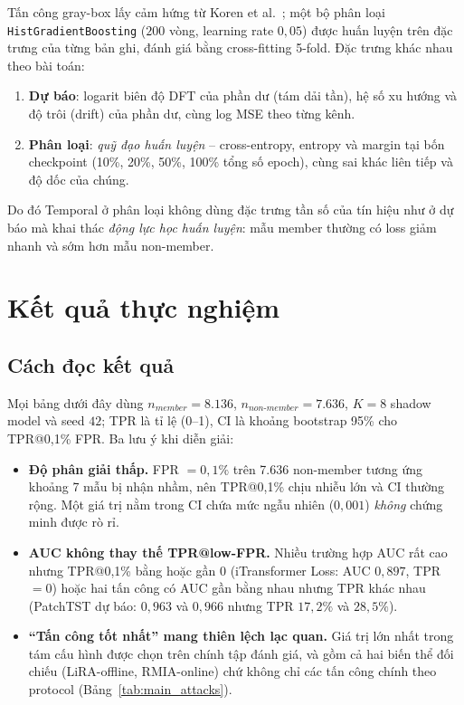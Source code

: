 \documentclass[12pt,a4paper]{report}
\begin{document}
Tấn công gray-box lấy cảm hứng từ Koren et al.\ \cite{koren2025}; một bộ phân loại \texttt{HistGradientBoosting} ($200$ vòng, learning rate $0{,}05$) được huấn luyện trên đặc trưng của từng bản ghi, đánh giá bằng cross-fitting 5-fold. Đặc trưng khác nhau theo bài toán:
\begin{enumerate}
  \item \textbf{Dự báo}: logarit biên độ DFT của phần dư (tám dải tần), hệ số xu hướng và độ trôi (drift) của phần dư, cùng log MSE theo từng kênh.
  \item \textbf{Phân loại}: \textit{quỹ đạo huấn luyện} -- cross-entropy, entropy và margin tại bốn checkpoint (10\%, 20\%, 50\%, 100\% tổng số epoch), cùng sai khác liên tiếp và độ dốc của chúng.
\end{enumerate}
Do đó Temporal ở phân loại không dùng đặc trưng tần số của tín hiệu như ở dự báo mà khai thác \textit{động lực học huấn luyện}: mẫu member thường có loss giảm nhanh và sớm hơn mẫu non-member.

\chapter{Kết quả thực nghiệm}
\label{chap:results}

\section{Cách đọc kết quả}

Mọi bảng dưới đây dùng $n_{member} = 8.136$, $n_{non\text{-}member} = 7.636$, $K = 8$ shadow model và seed $42$; TPR là tỉ lệ (0--1), CI là khoảng bootstrap 95\% cho TPR@0,1\% FPR. Ba lưu ý khi diễn giải:
\begin{itemize}
  \item \textbf{Độ phân giải thấp.} FPR $= 0{,}1\%$ trên 7.636 non-member tương ứng khoảng 7 mẫu bị nhận nhầm, nên TPR@0,1\% chịu nhiễu lớn và CI thường rộng. Một giá trị nằm trong CI chứa mức ngẫu nhiên ($0{,}001$) \textit{không} chứng minh được rò rỉ.
  \item \textbf{AUC không thay thế TPR@low-FPR.} Nhiều trường hợp AUC rất cao nhưng TPR@0,1\% bằng hoặc gần 0 (iTransformer Loss: AUC $0{,}897$, TPR $= 0$) hoặc hai tấn công có AUC gần bằng nhau nhưng TPR khác nhau (PatchTST dự báo: $0{,}963$ và $0{,}966$ nhưng TPR $17{,}2\%$ và $28{,}5\%$).
  \item \textbf{``Tấn công tốt nhất'' mang thiên lệch lạc quan.} Giá trị lớn nhất trong tám cấu hình được chọn trên chính tập đánh giá, và gồm cả hai biến thể đối chiếu (LiRA-offline, RMIA-online) chứ không chỉ các tấn công chính theo protocol (Bảng~\ref{tab:main_attacks}).
\end{itemize}
\end{document}
